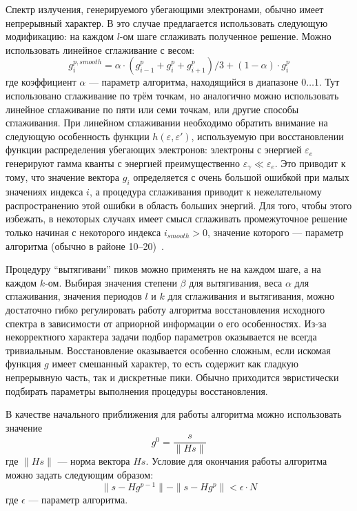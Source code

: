 Спектр излучения, генерируемого убегающими электронами, обычно имеет непрерывный характер. В это случае предлагается использовать следующую модификацию: на каждом $l$-ом шаге сглаживать полученное решение. Можно использовать линейное сглаживание с весом:
\begin{equation}
  \label{eq:SmoothMlemDisturb}
  g^{p, smooth}_i = \alpha \cdot \left( g^p_{i-1} + g^p_i + g^p_{i+1} \right)/3 + ( 1 - \alpha ) \cdot g^p_i
\end{equation}
где коэффициент $\alpha$ --- параметр алгоритма, находящийся в диапазоне $ 0 \ldots 1 $. Тут использовано сглаживание по трём точкам, но аналогично можно использовать линейное сглаживание по пяти или семи точкам, или другие способы сглаживания. При линейном сглаживании необходимо обратить внимание на следующую особенность функции $h(\varepsilon,\varepsilon')$, используемую при восстановлении функции распределения убегающих электронов: электроны с энергией $\varepsilon_e$ генерируют гамма кванты с энергией преимущественно $\varepsilon_{\gamma} \ll \varepsilon_e$. Это приводит к тому, что значение вектора $g_i$ определяется с очень большой ошибкой при малых значениях индекса $i$, а процедура сглаживания приводит к нежелательному распространению этой ошибки в область больших энергий. Для того, чтобы этого избежать, в некоторых случаях имеет смысл сглаживать промежуточное решение только начиная с некоторого индекса $i_{smooth} > 0$, значение которого --- параметр алгоритма (обычно в районе 10--20)~\cite{Khilkevitch2013}.

Процедуру ``вытягивани'' пиков можно применять не на каждом шаге, а на каждом $k$-ом. Выбирая значения степени $\beta$ для вытягивания, веса $\alpha$ для сглаживания, значения периодов $l$ и $k$ для сглаживания и вытягивания, можно достаточно гибко регулировать работу алгоритма восстановления исходного спектра в зависимости от априорной информации о его особенностях. Из-за некорректного характера задачи подбор параметров оказывается не всегда тривиальным. Восстановление оказывается особенно сложным, если искомая функция $g$ имеет смешанный характер, то есть содержит как гладкую непрерывную часть, так и дискретные пики. Обычно приходится эвристически подбирать параметры выполнения процедуры восстановления.

В качестве начального приближения для работы алгоритма можно использовать значение
\begin{equation*}
  g^0 = \frac{ s }{ \| H s \| }
\end{equation*}
где $ \| H s \| $ --- норма вектора $ H s $. Условие для окончания работы алгоритма можно задать следующим образом:
\begin{equation*}
  \| s - H g^{p-1} \| - \| s - H g^p \| < \epsilon \cdot N
\end{equation*}
где $\epsilon$ --- параметр алгоритма.~\cite{Shevelev2013} 

